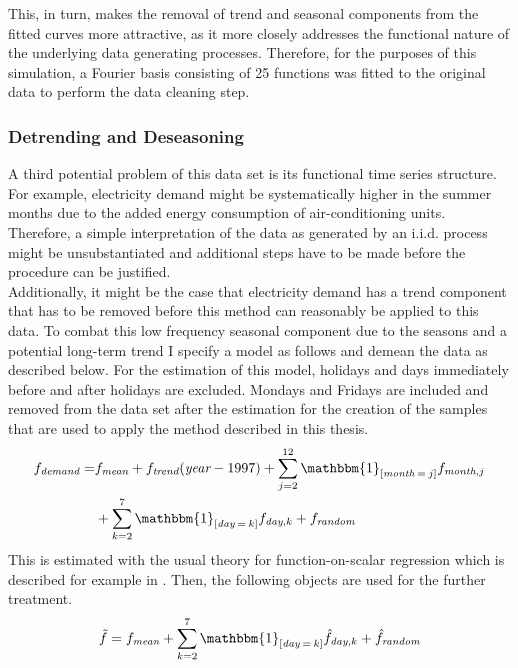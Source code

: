 \documentclass[12pt, a4paper]{article}
\theoremstyle{MAstyle} \newtheorem{assumption}{Assumption}[section]
\theoremstyle{MAstyle} \newtheorem{definition}{Definition}[section]
\theoremstyle{MAstyle} \newtheorem{theorem}{Theorem}[section]
\begin{document}
			This, in turn, makes the removal of trend and seasonal components from the fitted curves more attractive, as it more closely addresses the functional nature of the underlying data generating processes. Therefore, for the purposes of this simulation, a Fourier basis consisting of 25 functions was fitted to the original data to perform the data cleaning step.
			
			\subsubsection{Detrending and Deseasoning}
			A third potential problem of this data set is its functional time series structure. For example, electricity demand might be systematically higher in the summer months due to the added energy consumption of air-conditioning units. Therefore, a simple interpretation of the data as generated by an i.i.d. process might be unsubstantiated and additional steps have to be made before the procedure can be justified. \\
			Additionally, it might be the case that electricity demand has a trend component that has to be removed before this method can reasonably be applied to this data. To combat this low frequency seasonal component due to the seasons and a potential long-term trend I specify a model as follows and demean the data as described below. For the estimation of this model, holidays and days immediately before and after holidays are excluded. Mondays and Fridays are included and removed from the data set after the estimation for the creation of the samples that are used to apply the method described in this thesis.
			\begin{equation}\label{Data_Cleaning}
				\begin{split}
					f_{\textit{demand}} = &f_{\textit{mean}} + f_{\textit{trend}}(\textit{year} - 1997) + \sum_{j = 2}^{12}\mathbbm{1}_{\left[\textit{month}\: = \: j\right]}f_{\textit{month}, j}\\
					 &+ \sum_{k = 2}^{7}\mathbbm{1}_{\left[\textit{day}\: = \: k\right]}f_{\textit{day}, k} + f_{\textit{random}}
				\end{split}	
			\end{equation}
			This is estimated with the usual theory for function-on-scalar regression which is described for example in \cite{ramsay_functional_2005}. Then, the following objects are used for the further treatment.
			\begin{equation}
				\tilde{f} = f_{\textit{mean}} + \sum_{k = 2}^{7}\mathbbm{1}_{\left[\textit{day}\: = \: k\right]}\hat{f}_{\textit{day}, k} + \hat{f}_{\textit{random}}
			\end{equation}
\end{document}
